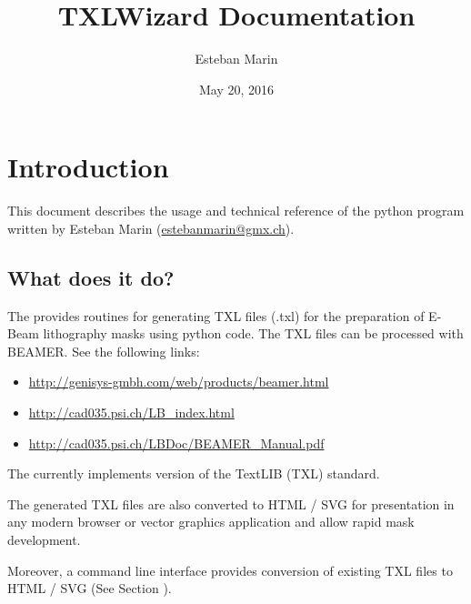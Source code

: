 \documentclass[letterpaper,10pt,english]{sphinxmanual}
\title{TXLWizard Documentation}
\date{May 20, 2016}
\author{Esteban Marin}
\begin{document}
\maketitle
\tableofcontents
{}\label{index::doc}



\chapter{Introduction}
\label{Chapters/10_Introduction:introduction}\label{Chapters/10_Introduction::doc}\label{Chapters/10_Introduction:welcome-to-txlwizard-s-documentation}
This document describes the usage and technical reference of the python program 
written by Esteban Marin (\href{mailto:estebanmarin@gmx.ch}{estebanmarin@gmx.ch}).


\section{What does it do?}
\label{Chapters/10_Introduction:what-does-it-do}
The  provides routines for generating TXL files (.txl) for
the preparation of E-Beam lithography masks using python code. The TXL files can be processed with BEAMER.
See the following links:
\begin{itemize}
\item {} 
\url{http://genisys-gmbh.com/web/products/beamer.html}

\item {} 
\url{http://cad035.psi.ch/LB\_index.html}

\item {} 
\url{http://cad035.psi.ch/LBDoc/BEAMER\_Manual.pdf}

\end{itemize}

The  currently implements version  of the TextLIB (TXL) standard.

The generated TXL files are also converted to HTML / SVG for presentation in any modern browser or
vector graphics application and allow rapid mask development.

Moreover, a command line interface  provides conversion of existing TXL files to HTML / SVG
(See Section {\hyperref[Chapters/30_TXLConverter:sec\string-txlconverter]{}}).
\end{document}
